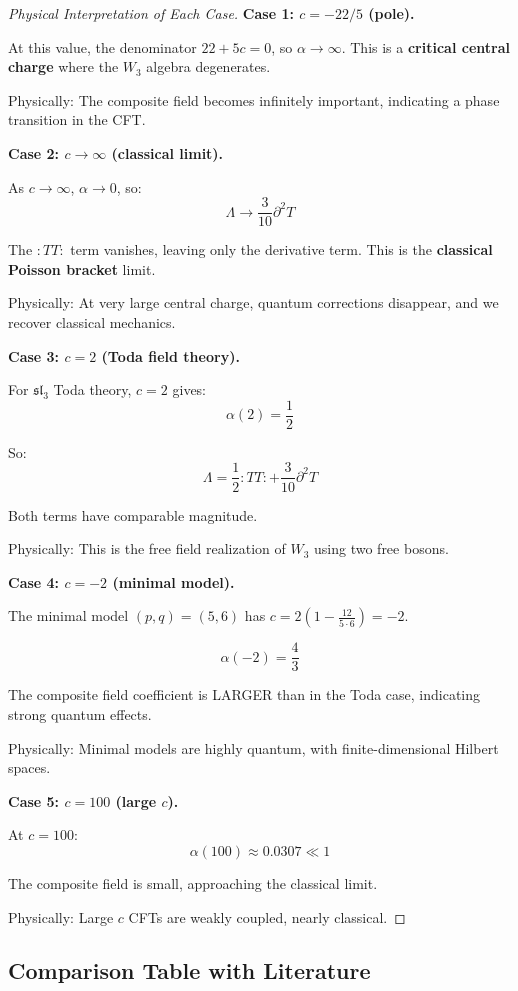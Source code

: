 \begin{proof}[Physical Interpretation of Each Case]

\textbf{Case 1: $c = -22/5$ (pole).}

At this value, the denominator $22 + 5c = 0$, so $\alpha \to \infty$. This is a 
\textbf{critical central charge} where the $W_3$ algebra degenerates. 

Physically: The composite field becomes infinitely important, indicating a phase 
transition in the CFT.

\textbf{Case 2: $c \to \infty$ (classical limit).}

As $c \to \infty$, $\alpha \to 0$, so:
$$\Lambda \to \frac{3}{10} \partial^2 T$$

The $:TT:$ term vanishes, leaving only the derivative term. This is the 
\textbf{classical Poisson bracket} limit.

Physically: At very large central charge, quantum corrections disappear, and we 
recover classical mechanics.

\textbf{Case 3: $c = 2$ (Toda field theory).}

For $\mathfrak{sl}_3$ Toda theory, $c = 2$ gives:
$$\alpha(2) = \frac{1}{2}$$

So:
$$\Lambda = \frac{1}{2} :TT: + \frac{3}{10} \partial^2 T$$

Both terms have comparable magnitude.

Physically: This is the free field realization of $W_3$ using two free bosons.

\textbf{Case 4: $c = -2$ (minimal model).}

The minimal model $(p,q) = (5,6)$ has $c = 2(1 - \frac{12}{5 \cdot 6}) = -2$.

$$\alpha(-2) = \frac{4}{3}$$

The composite field coefficient is LARGER than in the Toda case, indicating strong 
quantum effects.

Physically: Minimal models are highly quantum, with finite-dimensional Hilbert spaces.

\textbf{Case 5: $c = 100$ (large $c$).}

At $c = 100$:
$$\alpha(100) \approx 0.0307 \ll 1$$

The composite field is small, approaching the classical limit.

Physically: Large $c$ CFTs are weakly coupled, nearly classical.
\end{proof}

\subsection{Comparison Table with Literature}
\label{subsec:literature-comparison-table}

